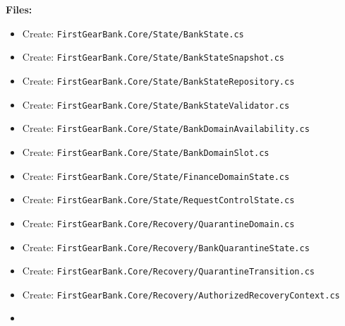 \documentclass[
  10pt,
  letterpaper,
]{article}
\providecommand{\tightlist}{%
  \setlength{\itemsep}{0pt}\setlength{\parskip}{0pt}}
\begin{document}
\textbf{Files:}

\begin{itemize}
\tightlist
\item
  Create:
  \texttt{FirstGearBank.}\allowbreak{}\texttt{Core/}\allowbreak{}\texttt{State/}\allowbreak{}\texttt{BankState.}\allowbreak{}\texttt{cs}
\item
  Create:
  \texttt{FirstGearBank.}\allowbreak{}\texttt{Core/}\allowbreak{}\texttt{State/}\allowbreak{}\texttt{BankStateSnapshot.}\allowbreak{}\texttt{cs}
\item
  Create:
  \texttt{FirstGearBank.}\allowbreak{}\texttt{Core/}\allowbreak{}\texttt{State/}\allowbreak{}\texttt{BankStateRepository.}\allowbreak{}\texttt{cs}
\item
  Create:
  \texttt{FirstGearBank.}\allowbreak{}\texttt{Core/}\allowbreak{}\texttt{State/}\allowbreak{}\texttt{BankStateValidator.}\allowbreak{}\texttt{cs}
\item
  Create:
  \texttt{FirstGearBank.}\allowbreak{}\texttt{Core/}\allowbreak{}\texttt{State/}\allowbreak{}\texttt{BankDomainAvailability.}\allowbreak{}\texttt{cs}
\item
  Create:
  \texttt{FirstGearBank.}\allowbreak{}\texttt{Core/}\allowbreak{}\texttt{State/}\allowbreak{}\texttt{BankDomainSlot.}\allowbreak{}\texttt{cs}
\item
  Create:
  \texttt{FirstGearBank.}\allowbreak{}\texttt{Core/}\allowbreak{}\texttt{State/}\allowbreak{}\texttt{FinanceDomainState.}\allowbreak{}\texttt{cs}
\item
  Create:
  \texttt{FirstGearBank.}\allowbreak{}\texttt{Core/}\allowbreak{}\texttt{State/}\allowbreak{}\texttt{RequestControlState.}\allowbreak{}\texttt{cs}
\item
  Create:
  \texttt{FirstGearBank.}\allowbreak{}\texttt{Core/}\allowbreak{}\texttt{Recovery/}\allowbreak{}\texttt{QuarantineDomain.}\allowbreak{}\texttt{cs}
\item
  Create:
  \texttt{FirstGearBank.}\allowbreak{}\texttt{Core/}\allowbreak{}\texttt{Recovery/}\allowbreak{}\texttt{BankQuarantineState.}\allowbreak{}\texttt{cs}
\item
  Create:
  \texttt{FirstGearBank.}\allowbreak{}\texttt{Core/}\allowbreak{}\texttt{Recovery/}\allowbreak{}\texttt{QuarantineTransition.}\allowbreak{}\texttt{cs}
\item
  Create:
  \texttt{FirstGearBank.}\allowbreak{}\texttt{Core/}\allowbreak{}\texttt{Recovery/}\allowbreak{}\texttt{AuthorizedRecoveryContext.}\allowbreak{}\texttt{cs}
\item

\end{itemize}
\end{document}
